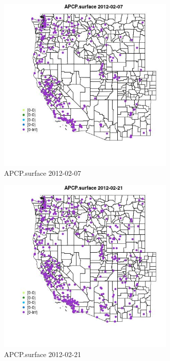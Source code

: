 \begin{figure} 
\centering  
\includegraphics[width=0.77\textwidth]{Code_Outputs/Report_ML_input_PM25_Step4_part_f_de_duplicated_aves_prioritize_24hr_obswNAs_MapObsAPCPsurface2012-02-07.jpg} 
\caption{\label{fig:Report_ML_input_PM25_Step4_part_f_de_duplicated_aves_prioritize_24hr_obswNAsMapObsAPCPsurface2012-02-07}APCP.surface 2012-02-07} 
\end{figure} 
 

\begin{figure} 
\centering  
\includegraphics[width=0.77\textwidth]{Code_Outputs/Report_ML_input_PM25_Step4_part_f_de_duplicated_aves_prioritize_24hr_obswNAs_MapObsAPCPsurface2012-02-21.jpg} 
\caption{\label{fig:Report_ML_input_PM25_Step4_part_f_de_duplicated_aves_prioritize_24hr_obswNAsMapObsAPCPsurface2012-02-21}APCP.surface 2012-02-21} 
\end{figure} 
 

